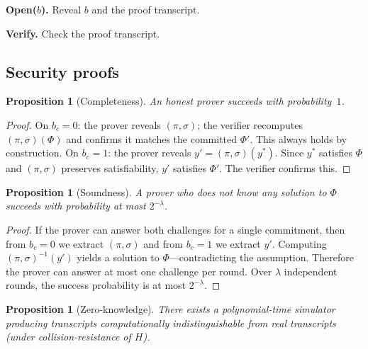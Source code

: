 \documentclass[11pt]{article}
\newtheorem{proposition}[theorem]{Proposition}
\begin{document}
\medskip\noindent\textbf{Open($b$).}  Reveal $b$ and the proof transcript.

\medskip\noindent\textbf{Verify.}  Check the proof transcript.


\subsection{Security proofs}

\begin{proposition}[Completeness]\label{prop:complete}
An honest prover succeeds with probability~$1$.
\end{proposition}

\begin{proof}
On $b_c = 0$: the prover reveals $(\pi,\sigma)$; the verifier recomputes $(\pi,\sigma)(\Phi)$ and confirms it matches the committed $\Phi'$.  This always holds by construction.  On $b_c = 1$: the prover reveals $y' = (\pi,\sigma)(y^*)$.  Since $y^*$ satisfies $\Phi$ and $(\pi,\sigma)$ preserves satisfiability, $y'$ satisfies $\Phi'$.  The verifier confirms this.
\end{proof}

\begin{proposition}[Soundness]\label{prop:sound}
A prover who does not know any solution to $\Phi$ succeeds with probability at most $2^{-\lambda}$.
\end{proposition}

\begin{proof}
If the prover can answer both challenges for a single commitment, then from $b_c = 0$ we extract $(\pi,\sigma)$ and from $b_c = 1$ we extract $y'$.  Computing $(\pi,\sigma)^{-1}(y')$ yields a solution to $\Phi$---contradicting the assumption.  Therefore the prover can answer at most one challenge per round.  Over $\lambda$ independent rounds, the success probability is at most $2^{-\lambda}$.
\end{proof}

\begin{proposition}[Zero-knowledge]\label{prop:zk}
There exists a polynomial-time simulator producing transcripts computationally indistinguishable from real transcripts (under collision-resistance of $H$).
\end{proposition}
\end{document}
